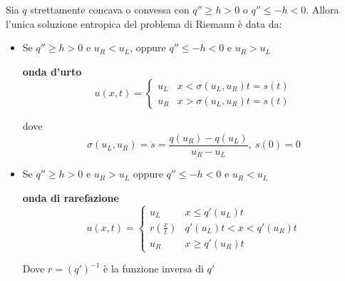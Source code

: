 \documentclass[10pt,a4paper,twoside,openright]{book}
\begin{document}
\begin{theorem}
	Sia $\displaystyle q$ strettamente concava o convessa con $\displaystyle q''\geqslant h >0$ o $\displaystyle q''\leqslant -h< 0$. Allora l'unica soluzione entropica del problema di Riemann è data da:
	\begin{itemize}
		\item Se $\displaystyle q''\geqslant h >0$ e $\displaystyle u_{R} < u_{L}$, oppure $\displaystyle q''\leqslant -h< 0$ e $\displaystyle u_{R}  >u_{L}$
		      
		      \textbf{onda d'urto}
		      \begin{equation*}
		      	u( x,t) =
		      	\begin{cases}
		      		u_{L} & x< \sigma ( u_{L} ,u_{R}) t=s( t) \\
		      		u_{R} & x >\sigma ( u_{L} ,u_{R}) t=s( t) 
		      	\end{cases}
		      \end{equation*}
		      
		      dove 
		      \begin{equation*}
		      	\sigma ( u_{L} ,u_{R}) =\dot{s} =\frac{q( u_{R}) -q( u_{L})}{u_{R} -u_{L}} ,\ s( 0) =0
		      \end{equation*}
		      
		      
		\item Se $\displaystyle q''\geqslant h >0$ e $\displaystyle u_{R}  >u_{L}$ oppure $\displaystyle q''\leqslant -h< 0$ e $\displaystyle u_{R} < u_{L}$
		      
		      \textbf{onda di rarefazione}
		      \begin{equation*}
		      	u( x,t) =
		      	\begin{cases}
		      		u_{L}                     & x\leqslant q'( u_{L}) t       \\
		      		r\left(\frac{x}{t}\right) & q'( u_{L}) t< x< q'( u_{R}) t \\
		      		u_{R}                     & x\geqslant q'( u_{R}) t       
		      	\end{cases}
		      \end{equation*}
		      
		      Dove $\displaystyle r=( q')^{-1}$ è la funzione inversa di $\displaystyle q'$
	\end{itemize}
\end{theorem}
\end{document}

